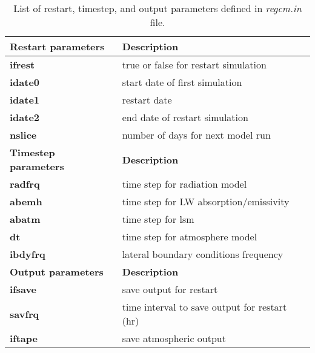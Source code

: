 \begin{table}[h]
\begin{center}
\caption{List of restart, timestep, and output parameters defined in {\it regcm.in} file.}  \label{regcm.in_file}
\vspace{0.25cm}
\begin{tabular}{|l|l|} \hline \hline
{\small {\bf Restart parameters}} &   {\small {\bf Description}} \\ \hline \hline
{\footnotesize {\bf ifrest}} & {\footnotesize true or false for restart simulation} \\ \hline
\hspace{.3cm} {\footnotesize {\bf idate0}} & {\footnotesize start date of first simulation} \\ \hline
\hspace{.3cm} {\footnotesize {\bf idate1}} & {\footnotesize restart date} \\ \hline
\hspace{.3cm} {\footnotesize {\bf idate2}} & {\footnotesize end date of restart simulation} \\ \hline
{\footnotesize {\bf nslice}} & {\footnotesize number of days for next model run} \\ \hline \hline
{\small {\bf Timestep parameters}} &   {\small {\bf Description}} \\ \hline \hline
{\footnotesize {\bf radfrq}} & {\footnotesize time step for radiation model} \\ \hline
\hspace{.3cm} {\footnotesize {\bf abemh}}  & {\footnotesize time step for LW absorption/emissivity} \\ \hline
{\footnotesize {\bf abatm}}  & {\footnotesize time step for lsm} \\ \hline
{\footnotesize {\bf dt}}     & {\footnotesize time step for atmosphere model} \\ \hline
{\footnotesize {\bf ibdyfrq}} & {\footnotesize lateral boundary conditions frequency} \\ \hline \hline
{\small {\bf Output parameters}} &   {\small {\bf Description}} \\ \hline \hline
{\footnotesize {\bf ifsave}} & {\footnotesize save output for restart} \\ \hline
\hspace{.3cm} {\footnotesize {\bf savfrq}} & {\footnotesize time interval to save output for restart (hr)} \\ \hline
{\footnotesize {\bf iftape}} & {\footnotesize save atmospheric output} \\ \hline

\end{tabular}
\end{center}
\end{table}
